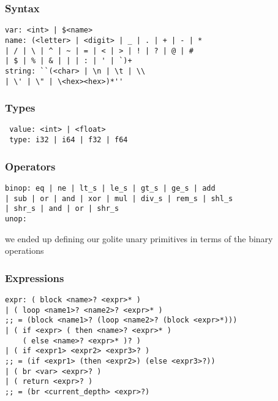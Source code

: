 \documentclass{beamer}
\begin{document}

\begin{frame}[fragile]
\frametitle{Syntax}
\begin{verbatim}
var: <int> | $<name>
name: (<letter> | <digit> | _ | . | + | - | *
| / | \ | ^ | ~ | = | < | > | ! | ? | @ | #
| $ | % | & | | | : | ' | `)+
string: ``(<char> | \n | \t | \\
| \' | \" | \<hex><hex>)*''
\end{verbatim}
\end{frame}


\begin{frame}[fragile]
\frametitle{Types}

\begin{verbatim}
 value: <int> | <float>
 type: i32 | i64 | f32 | f64
\end{verbatim}

\end{frame}


\begin{frame}[fragile]
\frametitle{Operators}
\begin{verbatim}
binop: eq | ne | lt_s | le_s | gt_s | ge_s | add
| sub | or | and | xor | mul | div_s | rem_s | shl_s
| shr_s | and | or | shr_s
unop:
\end{verbatim}
we ended up defining our golite unary primitives in terms of the binary operations
\end{frame}


\begin{frame}[fragile]
\frametitle{Expressions}

\begin{verbatim}
expr: ( block <name>? <expr>* )
| ( loop <name1>? <name2>? <expr>* )         
;; = (block <name1>? (loop <name2>? (block <expr>*)))
| ( if <expr> ( then <name>? <expr>* )
	( else <name>? <expr>* )? )
| ( if <expr1> <expr2> <expr3>? )            
;; = (if <expr1> (then <expr2>) (else <expr3>?))
| ( br <var> <expr>? )
| ( return <expr>? )                         
;; = (br <current_depth> <expr>?)

\end{verbatim}

\end{frame}
\end{document}
